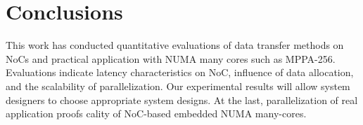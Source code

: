 \documentclass[conference,compsoc]{IEEEtran}
\begin{document}

\vspace{-3mm}
\section{Conclusions}
\label{sec:conclusion}
\vspace{-3mm}
This work has conducted quantitative evaluations of data transfer methods on NoCs and practical application with NUMA many cores such as MPPA-256.
Evaluations indicate latency characteristics on NoC, influence of data allocation, and the scalability of parallelization.
Our experimental results will allow system designers to choose appropriate system designs.
At the last, parallelization of real application proofs 
cality of NoC-based embedded NUMA many-cores.
\end{document}
